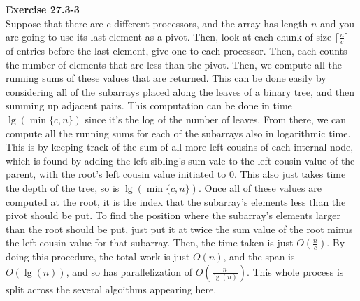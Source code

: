 \documentclass{article}
\begin{document}
\noindent\textbf{Exercise 27.3-3}\\

Suppose that there are c different processors, and the array has length $n$ and you are going to use its last element as a pivot. Then, look at each chunk of size $\lceil\frac{n}{c}\rceil$ of entries before the last element, give one to each processor. Then, each counts the number of elements that are less than the pivot. Then, we compute all the running sums of these values that are returned. This can be done easily by considering all of the subarrays placed along the leaves of a binary tree, and then summing up adjacent pairs. This computation can be done in time $\lg(\min\{c,n\})$ since it's the log of the number of leaves. From there, we can compute all the running sums for each of the subarrays also in logarithmic time. This is by keeping track of the sum of all more left cousins of each internal node, which is found by adding the left sibling's sum vale to the left cousin value of the parent, with the root's left cousin value initiated to 0. This also just takes time the depth of the tree, so is $\lg(\min\{c,n\})$. Once all of these values are computed at the root, it is the index that the subarray's elements less than the pivot should be put. To find the position where the subarray's elements larger than the root should be put, just put it at twice the sum value of the root minus the left cousin value for that subarray. Then, the time taken is just $O(\frac{n}{c})$. By doing this procedure, the total work is just $O(n)$, and the span is $O(\lg(n))$, and so has parallelization of $O(\frac{n}{\lg(n)})$. This whole process is split across the several algoithms appearing here.\\
\end{document}
